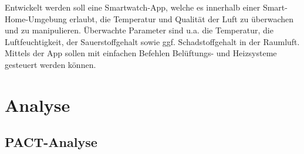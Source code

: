 \documentclass[a4paper,10pt]{article}
\begin{document}
\kopf
\renewcommand{\figurename}{Figure}


Entwickelt werden soll eine Smartwatch-App, welche es innerhalb einer Smart-Home-Umgebung erlaubt, die Temperatur und Qualität der Luft zu überwachen und zu manipulieren. Überwachte Parameter sind u.a. die Temperatur, die Luftfeuchtigkeit, der Sauerstoffgehalt sowie ggf. Schadstoffgehalt in der Raumluft. Mittels der App sollen mit einfachen Befehlen Belüftungs- und Heizsysteme gesteuert werden können.

\section{Analyse}

\subsection{PACT-Analyse}
\end{document}
